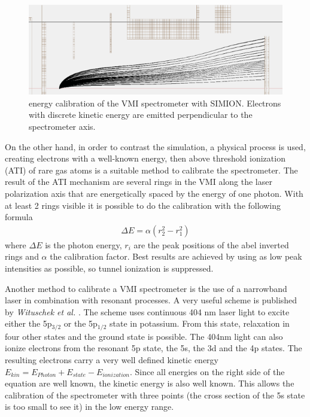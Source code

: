 \begin{figure}[h!]
\centering
\includegraphics[scale=1]{../images/simion_calib.png}
\caption{energy calibration of the VMI spectrometer with SIMION. Electrons with discrete kinetic energy are emitted perpendicular to the spectrometer axis.}
\end{figure}


On the other hand, in order to contrast the simulation, a physical process is used, creating electrons with a well-known energy, then above threshold ionization (ATI) of rare gas atoms is a suitable method to calibrate the spectrometer. The result of the ATI mechanism are several rings in the VMI along the laser polarization axis that are energetically spaced by the energy of one photon. With at least 2 rings visible it is possible to do the calibration with the following formula
\begin{align*}
\Delta E = \alpha (r_2^2-r_1^2)
\end{align*}
where $\Delta E$ is the photon energy, $r_i$ are the peak positions of the abel inverted rings and $\alpha$ the calibration factor. Best results are achieved by using as low peak intensities as possible, so tunnel ionization is suppressed.


Another method to calibrate a VMI spectrometer is the use of a narrowband laser in combination with resonant processes. A very useful scheme is published by \textit{Wituschek et al.} \cite{wituschek_simple_2016}. The scheme uses continuous 404 nm laser light to excite either the 5p${}_{3/2}$ or the 5p${}_{1/2}$ state in potassium. From this state, relaxation in four other states and the ground state is possible. The 404nm light can also ionize electrons from the resonant 5p state, the 5s, the 3d and the 4p states. The resulting electrons carry a very well defined kinetic energy $E_{kin}=E_{Photon}+E_{state}-E_{ionization}$. Since all energies on the right side of the equation are well known, the kinetic energy is also well known. This allows the calibration of the spectrometer with three points (the cross section of the 5s state is too small to see it) in the low energy range.

